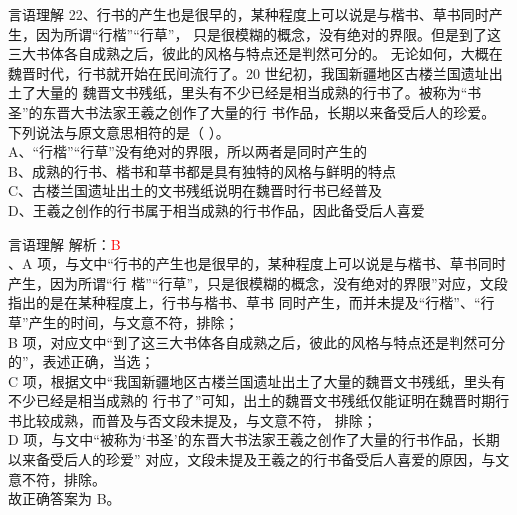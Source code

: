 \documentclass[aspectratio=169]{beamer}
\begin{document}
\begin{frame}[t]{言语理解}
    22、行书的产生也是很早的，某种程度上可以说是与楷书、草书同时产生，因为所谓“行楷”“行草”，
    只是很模糊的概念，没有绝对的界限。但是到了这三大书体各自成熟之后，彼此的风格与特点还是判然可分的。
    无论如何，大概在魏晋时代，行书就开始在民间流行了。20 世纪初，我国新疆地区古楼兰国遗址出土了大量的
    魏晋文书残纸，里头有不少已经是相当成熟的行书了。被称为“书圣”的东晋大书法家王羲之创作了大量的行
    书作品，长期以来备受后人的珍爱。\\
    下列说法与原文意思相符的是（ ）。\\
    A、“行楷”“行草”没有绝对的界限，所以两者是同时产生的\\
    B、成熟的行书、楷书和草书都是具有独特的风格与鲜明的特点\\
    C、古楼兰国遗址出土的文书残纸说明在魏晋时行书已经普及\\
    D、王羲之创作的行书属于相当成熟的行书作品，因此备受后人喜爱\\
\end{frame}



\begin{frame}[t]{言语理解}
    解析：\textcolor{red}{B}\\
    、A 项，与文中“行书的产生也是很早的，某种程度上可以说是与楷书、草书同时产生，因为所谓“行
    楷”“行草”，只是很模糊的概念，没有绝对的界限”对应，文段指出的是在某种程度上，行书与楷书、草书
    同时产生，而并未提及“行楷”、“行草”产生的时间，与文意不符，排除；\\
    B 项，对应文中“到了这三大书体各自成熟之后，彼此的风格与特点还是判然可分的”，表述正确，当选；\\
    C 项，根据文中“我国新疆地区古楼兰国遗址出土了大量的魏晋文书残纸，里头有不少已经是相当成熟的
    行书了”可知，出土的魏晋文书残纸仅能证明在魏晋时期行书比较成熟，而普及与否文段未提及，与文意不符，
    排除；\\
    D 项，与文中“被称为‘书圣’的东晋大书法家王羲之创作了大量的行书作品，长期以来备受后人的珍爱”
    对应，文段未提及王羲之的行书备受后人喜爱的原因，与文意不符，排除。\\
    故正确答案为 B。\\
\end{frame}
\end{document}

